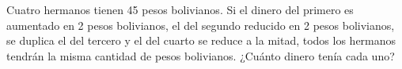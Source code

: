 Cuatro hermanos tienen 45 pesos bolivianos. Si el dinero del primero es aumentado en 2 pesos bolivianos, el del segundo reducido en 2 pesos bolivianos, se duplica el del tercero y el del cuarto se reduce a la mitad, todos los hermanos tendrán la misma cantidad de pesos bolivianos. ¿Cuánto dinero tenía cada uno?
